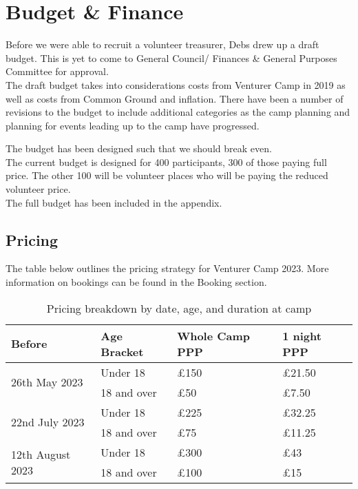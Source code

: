 \chapter{Budget \& Finance}

Before we were able to recruit a volunteer treasurer, Debs drew up a draft budget. This is yet to come to General Council/ Finances \& General Purposes Committee for approval.\\

The draft budget takes into considerations costs from Venturer Camp in 2019 as well as costs from Common Ground and inflation. There have been a number of revisions to the budget to include additional categories as the camp planning and planning for events leading up to the camp have progressed.

The budget has been designed such that we should break even.\\

The current budget is designed for 400 participants, 300 of those paying full price. The other 100 will be volunteer places who will be paying the reduced volunteer price.\\

The full budget has been included in the appendix.

\section{Pricing}
The table below outlines the pricing strategy for Venturer Camp 2023. More information on bookings can be found in the Booking section.
\begin{table}[H]
    \begin{tabularx}{\textwidth}{XXXX}
        \textbf{Before} & \textbf{Age Bracket} & \textbf{Whole Camp PPP} & \textbf{1 night PPP}\\
        \hline
        \hline
        \multirow{2}{*}{26th May 2023} & Under 18 & £150 & £21.50\\
        \cline{2-4}
         & 18 and over & £50 & £7.50\\
        \hline
        \multirow{2}{*}{22nd July 2023} & Under 18 & £225 & £32.25\\
        \cline{2-4}
         & 18 and over & £75 & £11.25\\
        \hline
        \multirow{2}{*}{12th August 2023} & Under 18 & £300 & £43\\
        \cline{2-4}
         & 18 and over & £100 & £15\\
        \hline
    \end{tabularx}
    \caption{Pricing breakdown by date, age, and duration at camp}
\end{table}

